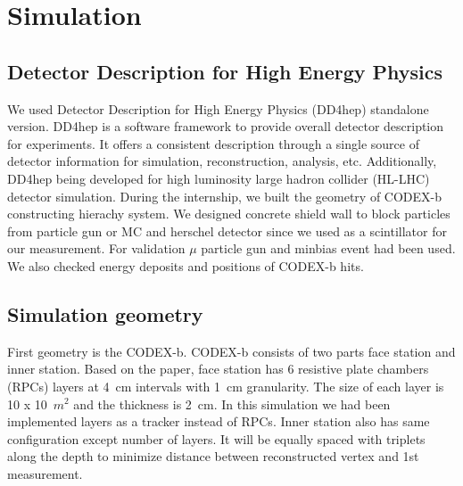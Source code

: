 \section{Simulation}
\label{sec:Simulation}

\subsection{Detector Description for High Energy Physics}
We used Detector Description for High Energy Physics (DD4hep) standalone version.
DD4hep is a software framework to provide overall detector description for experiments.
It offers a consistent description through a single source of detector information for simulation, reconstruction, analysis, etc.
Additionally, DD4hep being developed for high luminosity large hadron collider (HL-LHC) detector simulation.
During the internship, we built the geometry of CODEX-b constructing hierachy system.
We designed concrete shield wall to block particles from particle gun or MC and herschel detector since we used as a scintillator for our measurement.
For validation $\mu$ particle gun and minbias event had been used.
We also checked energy deposits and positions of CODEX-b hits. 


\subsection{Simulation geometry}
First geometry is the CODEX-b.
CODEX-b consists of two parts face station and inner station.
Based on the paper, face station has 6 resistive plate chambers (RPCs) layers at 4~cm intervals with 1~cm granularity.
The size of each layer is 10 x 10~$m^{2}$ and the thickness is 2~cm. 
In this simulation we had been implemented layers as a tracker instead of RPCs.
Inner station also has same configuration except number of layers.
It will be equally spaced with triplets along the depth to minimize distance between reconstructed vertex and 1st measurement. 

